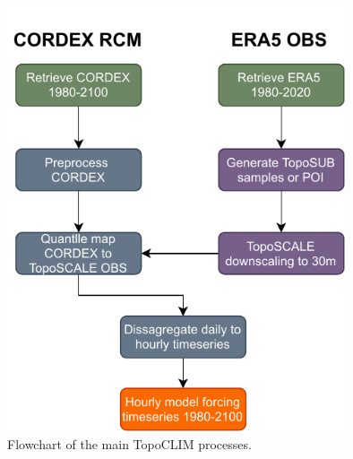 \documentclass[hess, manuscript]{copernicus}
\begin{document}
\begin{figure}[t]
\includegraphics[width=10cm]{"plots/qmap_flow.pdf"}
\caption{Flowchart of the main TopoCLIM processes.}
\label{fig:flow}
\end{figure}





\end{document}
